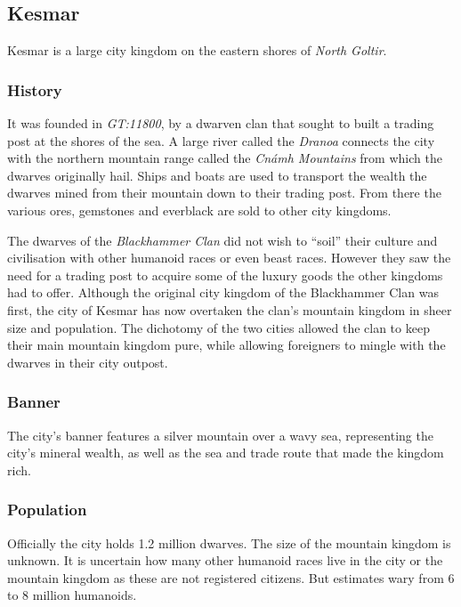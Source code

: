 \subsection{Kesmar}

Kesmar is a large city kingdom on the eastern shores of \emph{North Goltir}.

\subsubsection*{History}

It was founded in \emph{GT:11800}, by a dwarven clan that sought to built a
trading post at the shores of the sea. A large river called the \emph{Dranoa}
connects the city with the northern mountain range called the
\emph{Cnámh Mountains} from which the dwarves originally hail. Ships and
boats are used to transport the wealth the dwarves mined from their mountain
down to their trading post. From there the various ores, gemstones and everblack
are sold to other city kingdoms.

The dwarves of the \emph{Blackhammer Clan} did not wish to ``soil'' their
culture and civilisation with other humanoid races or even beast
races. However they saw the need for a trading post to acquire some of the
luxury goods the other kingdoms had to offer. Although the original city
kingdom of the Blackhammer Clan was first, the city of Kesmar has now
overtaken the clan's mountain kingdom in sheer size and population. The
dichotomy of the two cities allowed the clan to keep their main mountain
kingdom pure, while allowing foreigners to mingle with the dwarves in their
city outpost.

\subsubsection*{Banner}

The city's banner features a silver mountain over a wavy sea, representing the
city's mineral wealth, as well as the sea and trade route that made the
kingdom rich.

\subsubsection*{Population}

Officially the city holds 1.2 million dwarves. The size of the mountain
kingdom is unknown. It is uncertain how many other humanoid races live in
the city or the mountain kingdom as these are not registered citizens. But
estimates wary from 6 to 8 million humanoids.

